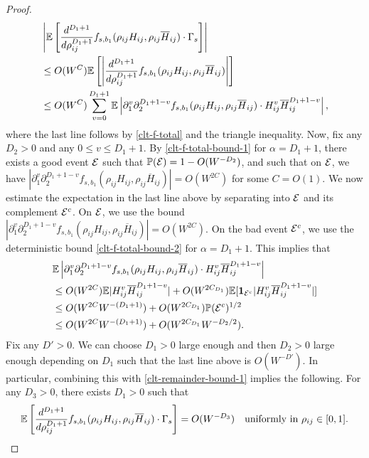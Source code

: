 \begin{proof}
%
\begin{align}
&\left|\mathbb{E}\left[\frac{d^{D_{1}+1}}{d\rho_{ij}^{D_{1}+1}}f_{s,b_{1}}(\rho_{ij}H_{ij},\rho_{ij}\overline{H}_{ij})\cdot\Gamma_{s}\right]\right|\nonumber\\
&\leq O(W^{C})\mathbb{E}\left[\left|\frac{d^{D_{1}+1}}{d\rho_{ij}^{D_{1}+1}}f_{s,b_{1}}(\rho_{ij}H_{ij},\rho_{ij}\overline{H}_{ij})\right|\right]\nonumber\\
&\leq O(W^{C})\sum_{v=0}^{D_{1}+1}\mathbb{E}\left|\partial_{1}^{v}\partial_{2}^{D_{1}+1-v}f_{s,b_{1}}(\rho_{ij} H_{ij},\rho_{ij}\overline{H}_{ij})\cdot H_{ij}^{v}\overline{H}_{ij}^{D_{1}+1-v}\right|,\label{clt-remainder-bound-1}
\end{align}
%
where the last line follows by \eqref{clt-f-total} and the triangle inequality. Now, fix any $D_{2}>0$ and any $0\leq v\leq D_{1}+1$. By \eqref{clt-f-total-bound-1} for $\alpha=D_{1}+1$, there exists a good event ${\cal E}$ such that $\mathbb{P}({\cal E})=1-O(W^{-D_{2}})$, and such that on ${\cal E}$, we have $|\partial_{1}^{v}\partial_{2}^{D_{1}+1-v}f_{s,b_{1}}(\rho_{ij} H_{ij},\rho_{ij}\overline{H}_{ij})|=O(W^{2C})$ for some $C=O(1)$. We now estimate the expectation in the last line above by separating into ${\cal E}$ and its complement ${\cal E}^{c}$. On ${\cal E}$, we use the bound $|\partial_{1}^{v}\partial_{2}^{D_{1}+1-v}f_{s,b_{1}}(\rho_{ij} H_{ij},\rho_{ij}\overline{H}_{ij})|=O(W^{2C})$. On the bad event ${\cal E}^{c}$, we use the deterministic bound \eqref{clt-f-total-bound-2} for $\alpha=D_{1}+1$. This implies that 
%
\begin{align}
&\mathbb{E}\left|\partial_{1}^{v}\partial_{2}^{D_{1}+1-v}f_{s,b_{1}}(\rho_{ij} H_{ij},\rho_{ij}\overline{H}_{ij})\cdot H_{ij}^{v}\overline{H}_{ij}^{D_{1}+1-v}\right|\\
&\leq O(W^{2C})\mathbb{E}|H_{ij}^{v}\overline{H}_{ij}^{D_{1}+1-v}|+O(W^{2C_{D_{1}}})\mathbb{E}[\mathbf{1}_{{\cal E}^{c}}|H_{ij}^{v}\overline{H}_{ij}^{D_{1}+1-v}|]\\
&\leq O(W^{2C}W^{-(D_{1}+1)})+O(W^{2C_{D_{1}}})\mathbb{P}({\cal E}^{c})^{1/2}\\
&\leq O(W^{2C}W^{-(D_{1}+1)})+O(W^{2C_{D_{1}}}W^{-D_{2}/2}).
\end{align}
%
Fix any $D'>0$. We can choose $D_{1}>0$ large enough and then $D_{2}>0$ large enough depending on $D_{1}$ such that the last line above is $O(W^{-D'})$. In particular, combining this with \eqref{clt-remainder-bound-1} implies the following. For any $D_{3}>0$, there exists $D_{1}>0$ such that 
%
\begin{align}
\E\left[\frac{d^{D_{1}+1}}{d\rho_{ij}^{D_{1}+1}}f_{s,b_{1}}(\rho_{ij}H_{ij},\rho_{ij}\overline{H}_{ij})\cdot\Gamma_{s}\right]=O(W^{-D_{3}})\quad\text{uniformly in }\rho_{ij}\in[0,1].\label{clt-remainder-bound}

\end{align}
\end{proof}
